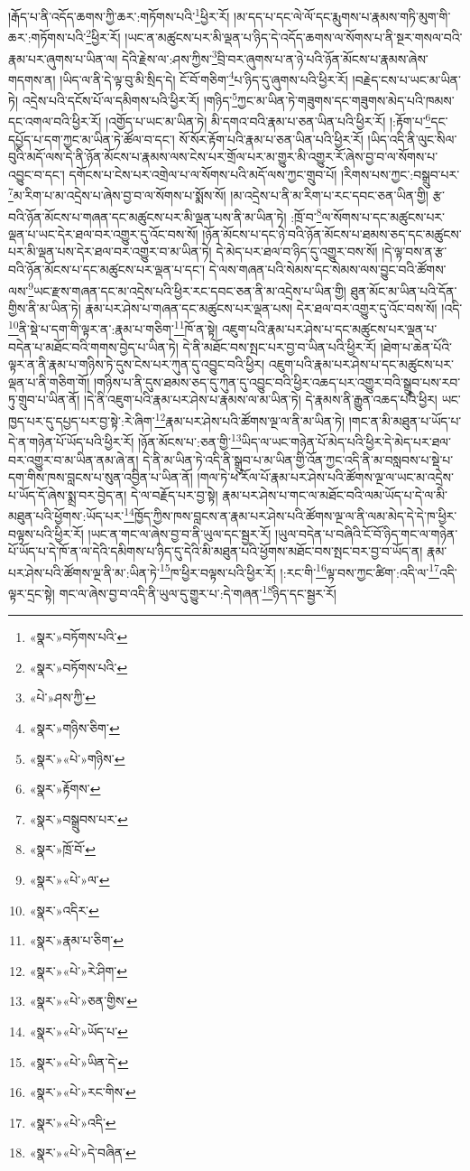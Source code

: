 །རྒོད་པ་ནི་འདོད་ཆགས་ཀྱི་ཆར་:གཏོགས་པའི་\footnote{«སྣར་»བཏོགས་པའི་}ཕྱིར་རོ། །མ་དད་པ་དང་ལེ་ལོ་དང་རྨུགས་པ་རྣམས་གཏི་མུག་གི་ཆར་:གཏོགས་པའི་\footnote{«སྣར་»བཏོགས་པའི་}ཕྱིར་རོ། །ཡང་ན་མཚུངས་པར་མི་ལྡན་པ་ཉིད་དེ་འདོད་ཆགས་ལ་སོགས་པ་ནི་སྔར་གསལ་བའི་རྣམ་པར་ཞུགས་པ་ཡིན་ལ། དེའི་རྗེས་ལ་:ཤས་ཀྱིས་\footnote{«པེ་»ཤས་ཀྱི་}བྲི་བར་ཞུགས་པ་ན་ཉེ་པའི་ཉོན་མོངས་པ་རྣམས་ཞེས་གདགས་ན། །ཡིད་ལ་ནི་དེ་ལྟ་བུ་མི་སྲིད་དེ། ངོ་བོ་གཅིག་\footnote{«སྣར་»གཉིས་ཅིག་}པ་ཉིད་དུ་ཞུགས་པའི་ཕྱིར་རོ། །བརྗེད་ངས་པ་ཡང་མ་ཡིན་ཏེ། འདྲེས་པའི་དངོས་པོ་ལ་དམིགས་པའི་ཕྱིར་རོ། །གཉིད་\footnote{«སྣར་»«པེ་»གཉིས་}ཀྱང་མ་ཡིན་ཏེ་གཟུགས་དང་གཟུགས་མེད་པའི་ཁམས་དང་འགལ་བའི་ཕྱིར་རོ། །འགྱོད་པ་ཡང་མ་ཡིན་ཏེ། མི་དགའ་བའི་རྣམ་པ་ཅན་ཡིན་པའི་ཕྱིར་རོ། །:རྟོག་པ་\footnote{«སྣར་»རྟོགས་}དང་དཔྱོད་པ་དག་ཀྱང་མ་ཡིན་ཏེ་ཚོལ་བ་དང་། སོ་སོར་རྟོག་པའི་རྣམ་པ་ཅན་ཡིན་པའི་ཕྱིར་རོ། །ཡིད་འདི་ནི་ལུང་སིལ་བུའི་མདོ་ལས་དེ་ནི་ཉོན་མོངས་པ་རྣམས་ལས་ངེས་པར་གྲོལ་པར་མ་གྱུར་མི་འགྱུར་རོ་ཞེས་བྱ་བ་ལ་སོགས་པ་འབྱུང་བ་དང་། དགོངས་པ་ངེས་པར་འགྲེལ་པ་ལ་སོགས་པའི་མདོ་ལས་ཀྱང་གྲུབ་པོ། །རིགས་པས་ཀྱང་:བསྒྲུབ་པར་\footnote{«སྣར་»བསྒྲུབས་པར་}མ་རིག་པ་མ་འདྲེས་པ་ཞེས་བྱ་བ་ལ་སོགས་པ་སྨོས་སོ། །མ་འདྲེས་པ་ནི་མ་རིག་པ་རང་དབང་ཅན་ཡིན་གྱི། རྩ་བའི་ཉོན་མོངས་པ་གཞན་དང་མཚུངས་པར་མི་ལྡན་པས་ནི་མ་ཡིན་ཏེ། :ཁྲོ་བ་\footnote{«སྣར་»ཁྲོ་བོ་}ལ་སོགས་པ་དང་མཚུངས་པར་ལྡན་པ་ཡང་དེར་ཐལ་བར་འགྱུར་དུ་འོང་བས་སོ། །ཉོན་མོངས་པ་དང་ཉེ་བའི་ཉོན་མོངས་པ་ཐམས་ཅད་དང་མཚུངས་པར་མི་ལྡན་པས་དེར་ཐལ་བར་འགྱུར་བ་མ་ཡིན་ཏེ། དེ་མེད་པར་ཐལ་བ་ཉིད་དུ་འགྱུར་བས་སོ། །དེ་ལྟ་བས་ན་རྩ་བའི་ཉོན་མོངས་པ་དང་མཚུངས་པར་ལྡན་པ་དང་། དེ་ལས་གཞན་པའི་སེམས་དང་སེམས་ལས་བྱུང་བའི་ཚོགས་ལས་\footnote{«སྣར་»«པེ་»ལ་}ཡང་རྫས་གཞན་དང་མ་འདྲེས་པའི་ཕྱིར་རང་དབང་ཅན་ནི་མ་འདྲེས་པ་ཡིན་གྱི། ཐུན་མོང་མ་ཡིན་པའི་དོན་གྱིས་ནི་མ་ཡིན་ཏེ། རྣམ་པར་ཤེས་པ་གཞན་དང་མཚུངས་པར་ལྡན་པས། དེར་ཐལ་བར་འགྱུར་དུ་འོང་བས་སོ། །འདི་\footnote{«སྣར་»འདིར་}ནི་སྡེ་པ་དག་གི་ལྟར་ན་:རྣམ་པ་གཅིག་\footnote{«སྣར་»རྣམ་པ་ཅིག་}ཁོ་ན་སྟེ། འཇུག་པའི་རྣམ་པར་ཤེས་པ་དང་མཚུངས་པར་ལྡན་པ་བདེན་པ་མཐོང་བའི་གགས་བྱེད་པ་ཡིན་ཏེ། དེ་ནི་མཐོང་བས་སྤང་པར་བྱ་བ་ཡིན་པའི་ཕྱིར་རོ། །ཐེག་པ་ཆེན་པོའི་ལྟར་ན་ནི་རྣམ་པ་གཉིས་ཏེ་དུས་ངེས་པར་ཀུན་དུ་འབྱུང་བའི་ཕྱིར། འཇུག་པའི་རྣམ་པར་ཤེས་པ་དང་མཚུངས་པར་ལྡན་པ་ནི་གཅིག་གོ། །གཉིས་པ་ནི་དུས་ཐམས་ཅད་དུ་ཀུན་དུ་འབྱུང་བའི་ཕྱིར་འཆད་པར་འགྱུར་བའི་སྒྲུབ་པས་རབ་ཏུ་གྲུབ་པ་ཡིན་ནོ། །དེ་ནི་འཇུག་པའི་རྣམ་པར་ཤེས་པ་རྣམས་ལ་མ་ཡིན་ཏེ། དེ་རྣམས་ནི་རྒྱུན་འཆད་པའི་ཕྱིར། ཡང་ཁྱད་པར་དུ་དཔྱད་པར་བྱ་སྟེ་:རེ་ཞིག་\footnote{«སྣར་»«པེ་»རེ་ཤིག་}རྣམ་པར་ཤེས་པའི་ཚོགས་ལྔ་ལ་ནི་མ་ཡིན་ཏེ། །གང་ན་མི་མཐུན་པ་ཡོད་པ་དེ་ན་གཉེན་པོ་ཡོད་པའི་ཕྱིར་རོ། །ཉོན་མོངས་པ་:ཅན་གྱི་\footnote{«སྣར་»«པེ་»ཅན་གྱིས་}ཡིད་ལ་ཡང་གཉེན་པོ་མེད་པའི་ཕྱིར་དེ་མེད་པར་ཐལ་བར་འགྱུར་བ་མ་ཡིན་ནམ་ཞེ་ན། དེ་ནི་མ་ཡིན་ཏེ་འདི་ནི་སྒྲུབ་པ་མ་ཡིན་གྱི་འོན་ཀྱང་འདི་ནི་མ་བསླབས་པ་སྡེ་པ་དག་གིས་ཁས་བླངས་པ་སུན་འབྱིན་པ་ཡིན་ནོ། །གལ་ཏེ་ཕ་རོལ་པོ་རྣམ་པར་ཤེས་པའི་ཚོགས་ལྔ་ལ་ཡང་མ་འདྲེས་པ་ཡོད་དོ་ཞེས་སྨྲ་བར་བྱེད་ན། དེ་ལ་བརྗོད་པར་བྱ་སྟེ། རྣམ་པར་ཤེས་པ་གང་ལ་མཐོང་བའི་ལམ་ཡོད་པ་དེ་ལ་མི་མཐུན་པའི་ཕྱོགས་:ཡོད་པར་\footnote{«སྣར་»«པེ་»ཡོད་པ་}ཁྱོད་ཀྱིས་ཁས་བླངས་ན་རྣམ་པར་ཤེས་པའི་ཚོགས་ལྔ་ལ་ནི་ལམ་མེད་དེ་དེ་ཁ་ཕྱིར་བལྟས་པའི་ཕྱིར་རོ། །ཡང་ན་གང་ལ་ཞེས་བྱ་བ་ནི་ཡུལ་དང་སྦྱར་རོ། །ཡུལ་བདེན་པ་བཞིའི་ངོ་བོ་ཉིད་གང་ལ་གཉེན་པོ་ཡོད་པ་དེ་ཁོ་ན་ལ་དེའི་དམིགས་པ་ཉིད་དུ་དེའི་མི་མཐུན་པའི་ཕྱོགས་མཐོང་བས་སྤང་བར་བྱ་བ་ཡོད་ན། རྣམ་པར་ཤེས་པའི་ཚོགས་ལྔ་ནི་མ་:ཡིན་ཏེ་\footnote{«སྣར་»«པེ་»ཡིན་དེ་}ཁ་ཕྱིར་བལྟས་པའི་ཕྱིར་རོ། །:རང་གི་\footnote{«སྣར་»«པེ་»རང་གིས་}ལྟ་བས་ཀྱང་ཚིག་:འདི་ལ་\footnote{«སྣར་»«པེ་»འདི་}འདི་ལྟར་དྲང་སྟེ། གང་ལ་ཞེས་བྱ་བ་འདི་ནི་ཡུལ་དུ་གྱུར་པ་:དེ་གཞན་\footnote{«སྣར་»«པེ་»དེ་བཞིན་}ཉིད་དང་སྦྱར་རོ། 
